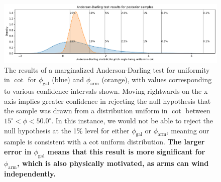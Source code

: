 \begin{figure}
  \includegraphics[width=17.7cm]{plots/combined_cot_uniform_marginalized_tests.pdf}
  \caption{The results of a marginalized Anderson-Darling test for uniformity in $\cot$ for $\phi_\mathrm{gal}$ (blue) and $\phi_\mathrm{arm}$ (orange), with values corresponding to various confidence intervals shown. Moving rightwards on the x-axis implies greater confidence in rejecting the null hypothesis that the sample was drawn from a distribution uniform in $\cot$ between $15^\circ < \phi < 50.0^\circ$. In this instance, we would not be able to reject the null hypothesis at the 1\% level for either $\phi_\mathrm{gal}$ or $\phi_\mathrm{arm}$, meaning our sample is consistent with a cot uniform distribution. {\bf The larger error in $\phi_\mathrm{gal}$  means that this result is more significant for $\phi_\mathrm{arm}$, which is also physically motivated, as arms can wind independently.}}
  \label{fig:ad-cot-test}
\end{figure}
